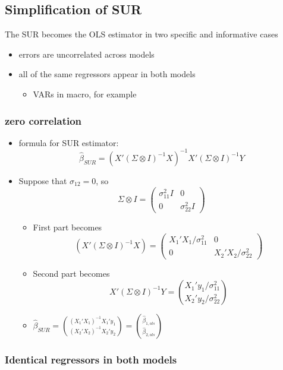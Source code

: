 \documentclass[11pt]{article}
\begin{document}
\subsection{Simplification of SUR}
\label{sec-2-5}

     The SUR becomes the OLS estimator in two specific and informative
     cases
\begin{itemize}
\item errors are uncorrelated across models
\item all of the same regressors appear in both models
\begin{itemize}
\item VARs in macro, for example
\end{itemize}
\end{itemize}
\subsubsection{zero correlation}
\label{sec-2-5-1}

\begin{itemize}
\item formula for SUR estimator:
       \[\hat\beta_{SUR} = (X'(\Sigma \otimes I)^{-1}X)^{-1}X'(\Sigma
       \otimes I)^{-1}Y\]
\item Suppose that $\sigma_{12} = 0$, so
        \[ \Sigma \otimes I = (\begin{matrix} \sigma_{11}^2 I & 0 \\ 0
        & \sigma_{22}^2 I \end{matrix})\]
\begin{itemize}
\item First part becomes \[(X'( \Sigma \otimes I)^{-1} X)
          = (\begin{matrix} X_1'X_1 / \sigma_{11}^2 & 0 \\ 0 & X_2'X_2
          / \sigma_{22}^2 \end{matrix}) \]
\item Second part becomes 
          \[X'(\Sigma \otimes I)^{-1}Y = \binom{X_1' y_1 /
          \sigma_{11}^2}{X_2'y_2 / \sigma_{22}^2}\]
\item $\hat\beta_{SUR} =
          \binom{(X_1'X_1)^{-1}X_1'y_1}{(X_2'X_2)^{-1}X_2'y_2} =
          \binom{\hat\beta_{1,ols}}{\hat\beta_{2,ols}}$
\end{itemize}
\end{itemize}
\subsubsection{Identical regressors in both models}
\label{sec-2-5-2}
\end{document}
